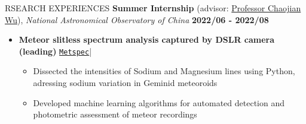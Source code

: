 \documentclass[10pt]{article} %
\begin{document}
\begin{section}{RSEARCH EXPERIENCES}
\textbf{Summer Internship} (advisor: \href{mailto:chjwu@bao.ac.cn}{Professor Chaojian Wu}), \textit{National Astronomical Observatory of China} \hfill \textbf{2022/06 - 2022/08} 
\begin{itemize}[leftmargin=1.5em]
    \item \textbf{Meteor slitless spectrum analysis captured by DSLR camera (leading)} 
    \hfill {\footnotesize \href{https://github.com/Chisen-Lupus/metspec}{\texttt{Metspec}}}| %
    \begin{itemize}[leftmargin=1.5em]
        \item Dissected the intensities of Sodium and Magnesium lines using Python, adressing sodium variation in Geminid meteoroids
        \item Developed machine learning algorithms for automated detection and photometric assessment of meteor recordings
    \end{itemize}
\end{itemize}


\end{section}
\end{document}
